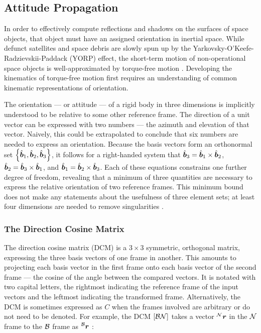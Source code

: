 \subsection{Attitude Propagation}

In order to effectively compute reflections and shadows on the surfaces of space objects, that object must have an assigned orientation in inertial space. While defunct satellites and space debris are slowly spun up by the Yarkovsky-O'Keefe-Radzievskii-Paddack (YORP) effect, the short-term motion of non-operational space objects is well-approximated by torque-free motion \cite{benson2018cyclic}. Developing the kinematics of torque-free motion first requires an understanding of common kinematic representations of orientation.

The orientation --- or attitude --- of a rigid body in three dimensions is implicitly understood to be relative to some other reference frame. The direction of a unit vector can be expressed with two numbers ---  the azimuth and elevation of that vector. Naively, this could be extrapolated to conclude that six numbers are needed to express an orientation. Because the basis vectors form an orthonormal set $\left\{ \hat{\bm{b}}_1, \hat{\bm{b}}_2, \hat{\bm{b}}_3\right\}$, it follows for a right-handed system that $\hat{\bm{b}}_3 = \hat{\bm{b}}_1 \times \hat{\bm{b}}_2$, $\hat{\bm{b}}_2 = \hat{\bm{b}}_3 \times \hat{\bm{b}}_1$, and $\hat{\bm{b}}_1 = \hat{\bm{b}}_2 \times \hat{\bm{b}}_3$. Each of these equations constrains one further degree of freedom, revealing that a minimum of three quantities are necessary to express the relative orientation of two reference frames. This minimum bound does not make any statements about the usefulness of three element sets; at least four dimensions are needed to remove singularities \cite{crassidis1ed}.

\subsubsection{The Direction Cosine Matrix}

The direction cosine matrix (DCM) is a $3\times3$ symmetric, orthogonal matrix, expressing the three basis vectors of one frame in another. This amounts to projecting each basis vector in the first frame onto each basis vector of the second frame --- the cosine of the angle between the compared vectors. It is notated with two capital letters, the rightmost indicating the reference frame of the input vectors and the leftmost indicating the transformed frame. Alternatively, the DCM is sometimes expressed as $C$ when the frames involved are arbitrary or do not need to be denoted. For example, the DCM $\dcm{bn}$ takes a vector $\vrf{n}{r}$ in the $\rf{n}$ frame to the $\rf{b}$ frame as $\vrf{b}{r}$ \cite{shuster1993}:

